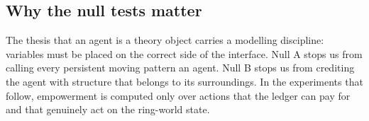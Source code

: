 \subsection{Why the null tests matter}
The thesis that an agent is a theory object carries a modelling discipline: variables must be placed on the correct side of the interface. Null A stops us from calling every persistent moving pattern an agent. Null B stops us from crediting the agent with structure that belongs to its surroundings. In the experiments that follow, empowerment is computed only over actions that the ledger can pay for and that genuinely act on the ring-world state.
